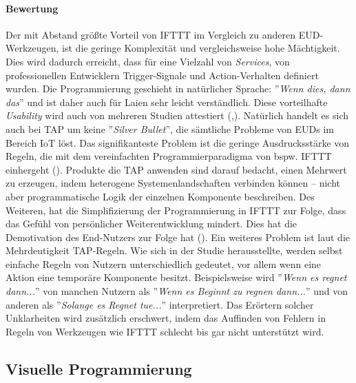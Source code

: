 \paragraph{Bewertung} Der mit Abstand größte Vorteil von IFTTT im Vergleich zu anderen \ac{EUD}-Werkzeugen, ist die geringe Komplexität und vergleichsweise hohe Mächtigkeit. Dies wird dadurch erreicht, dass für eine Vielzahl von \textit{Services}, von professionellen Entwicklern Trigger-Signale und Action-Verhalten definiert wurden. Die Programmierung geschieht in natürlicher Sprache: ''\textit{Wenn dies, dann das}'' und ist daher auch für Laien sehr leicht verständlich. Diese vorteilhafte \textit{Usability} wird auch von mehreren Studien attestiert (\cite{huang2015supporting},\cite{ur2014practical}). 
Natürlich handelt es sich auch bei \ac{TAP} um keine ''\textit{Silver Bullet}'', die sämtliche Probleme von \acp{EUD} im Bereich \ac{IoT} löst. Das signifikanteste Problem ist die geringe Ausdrucksstärke von Regeln, die mit dem vereinfachten Programmierparadigma von bspw. IFTTT einhergeht (\cite{ur2016trigger}). Produkte die \ac{TAP} anwenden sind darauf bedacht, einen Mehrwert zu erzeugen, indem heterogene Systemenlandschaften verbinden können -- nicht aber programmatische Logik der einzelnen Komponente beschreiben. Des Weiteren, hat die Simplifizierung der Programmierung in IFTTT zur Folge, dass das Gefühl von persönlicher Weiterentwicklung mindert. Dies hat die Demotivation des End-Nutzers zur Folge hat (\cite{ur2016trigger}). Ein weiteres Problem ist laut \cite{huang2015supporting} die Mehrdeutigkeit \ac{TAP}-Regeln. Wie sich in der Studie herausstellte, werden selbst einfache Regeln von Nutzern unterschiedlich gedeutet, vor allem wenn eine Aktion eine temporäre Komponente besitzt. Beispielsweise wird ''\textit{Wenn es regnet dann...}'' von manchen Nutzern als ''\textit{Wenn es Beginnt zu regnen dann...}'' und von anderen als ''\textit{Solange es Regnet tue...}'' interpretiert. Das Erörtern solcher Unklarheiten wird zusätzlich erschwert, indem das Auffinden von Fehlern in Regeln von Werkzeugen wie IFTTT schlecht bis gar nicht unterstützt wird.

\subsection{Visuelle Programmierung}\label{subsubsec:samlabs}

